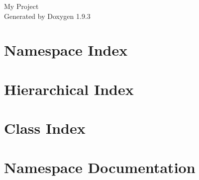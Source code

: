 \documentclass[twoside]{book}
\newcommand{\+}{\discretionary{\mbox{\scriptsize$\hookleftarrow$}}{}{}}
\newcommand{\clearemptydoublepage}{%
    \newpage{\pagestyle{empty}\cleardoublepage}%
  }
\begin{document}
  \raggedbottom
    \hypersetup{pageanchor=false,
                bookmarksnumbered=true,
                pdfencoding=unicode
               }
  \begin{titlepage}
  \vspace*{7cm}
  \begin{center}%
  {\Large My Project}\\
  \vspace*{1cm}
  {\large Generated by Doxygen 1.9.3}\\
  \end{center}
  \end{titlepage}
  \clearemptydoublepage
  \tableofcontents
  \clearemptydoublepage
  \hypersetup{pageanchor=true}
\chapter{Namespace Index}

\chapter{Hierarchical Index}

\chapter{Class Index}

\chapter{Namespace Documentation}















\end{document}
